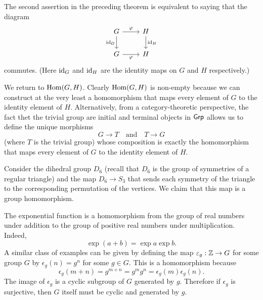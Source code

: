 \begin{remark}
    The second assertion in the preceding theorem is equivalent to saying that
    the diagram
    \[
        \begin{tikzcd}
            G \arrow{r}{\phi} \arrow[swap]{d}{\id_G} & H \arrow{d}{\id_H} \\
            G \arrow[swap]{r}{\phi} & H
        \end{tikzcd}
    \]
    commutes. (Here \(\operatorname{id}_G\) and \(\operatorname{id}_H\) are the identity maps on \(G\) and
    \(H\) respectively.)
\end{remark}

\begin{example}
    We return to \(\operatorname{Hom}(G, H)\). Clearly \(\operatorname{Hom}(G, H)\) is non-empty because we
    can construct at the very least a homomorphism that maps every element of
    \(G\) to the identity element of \(H\). Alternatively, from a
    category-theoretic perspective, the fact thet the trivial group are initial
    and terminal objects in \(\mathsf{Grp}\) allows us to define the unique morphisms
    \[
        G \to T \quad \text{and} \quad T \to G
    \]
    (where \(T\) is the trivial group) whose composition is exactly the
    homomorphism that maps every element of \(G\) to the identity element of
    \(H\).
\end{example}

\begin{example}
    Consider the dihedral group \(D_6\) (recall that \(D_6\) is the group of
    symmetries of a regular triangle) and the map \(D_6 \to S_3\) that sends
    each symmetry of the triangle to the corresponding permutation of the
    vertices. We claim that this map is a group homomorphism.
\end{example}

\begin{example}
    The exponential function is a homomorphism from the group of real numbers
    under addition to the group of positive real numbers under multiplication.
    Indeed,
    \[
        \exp (a + b) = \exp a \exp b.
    \]
    A similar class of examples can be given by defining the map \(\varepsilon_g :
    \mathbb{Z} \to G\) for some group \(G\) by \(\epsilon_g(n) = g^n\) for some \(g \in
    G\). This is a homomorphism because
    \[
        \epsilon_g(m + n) = g^{m + n} = g^m g^n = \epsilon_g(m) \epsilon_g(n).
    \]
    The image of \(\epsilon_g\) is a cyclic subgroup of \(G\) generated by
    \(g\). Therefore if \(\epsilon_g\) is surjective, then \(G\) itself must be
    cyclic and generated by \(g\).
\end{example}

